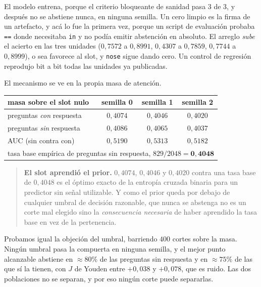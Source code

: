 \documentclass[11pt,a4paper]{article}
\begin{document}
El modelo entrena, porque el criterio bloqueante de sanidad pasa 3 de 3, y después no se abstiene
nunca, en ninguna semilla. Un cero limpio es la firma de un artefacto, y acá lo fue la primera vez,
porque un script de evaluación probaba \texttt{==} donde necesitaba \texttt{in} y no podía emitir
abstención en absoluto. El arreglo \emph{sube} el acierto en las tres unidades ($0{,}7572$ a
$0{,}8991$, $0{,}4307$ a $0{,}7859$, $0{,}7744$ a $0{,}8999$), o sea favorece al slot, y
\texttt{nose} sigue dando cero. Un control de regresión reprodujo bit a bit todas las unidades ya
publicadas.

El mecanismo se ve en la propia masa de atención.

\begin{center}
\begin{tabular}{lccc}
\toprule
masa sobre el slot nulo & semilla 0 & semilla 1 & semilla 2 \\
\midrule
preguntas \emph{con} respuesta & $0{,}4074$ & $0{,}4046$ & $0{,}4020$ \\
preguntas \emph{sin} respuesta & $0{,}4086$ & $0{,}4065$ & $0{,}4037$ \\
AUC (sin contra con) & $0{,}5190$ & $0{,}5313$ & $0{,}5182$ \\
\midrule
\multicolumn{4}{c}{tasa base empírica de preguntas sin respuesta, $829/2048 = \mathbf{0{,}4048}$}\\
\bottomrule
\end{tabular}
\end{center}

\begin{quote}
\textbf{El slot aprendió el prior.} $0{,}4074$, $0{,}4046$ y $0{,}4020$ contra una tasa base de
$0{,}4048$ es el óptimo exacto de la entropía cruzada binaria para un predictor sin señal utilizable.
Y como el prior queda por debajo de cualquier umbral de decisión razonable, que nunca se abstenga no
es un corte mal elegido sino la \emph{consecuencia necesaria} de haber aprendido la tasa base en vez
de la pertenencia.
\end{quote}

Probamos igual la objeción del umbral, barriendo $400$ cortes sobre la masa. Ningún umbral pasa la
compuerta en ninguna semilla, y el mejor punto alcanzable abstiene en $\approx 80\%$ de las preguntas
sin respuesta y en $\approx 75\%$ de las que sí la tienen, con $J$ de Youden entre $+0{,}038$ y
$+0{,}078$, que es ruido. Las dos poblaciones no se separan, y por eso ningún corte puede separarlas.
\end{document}
